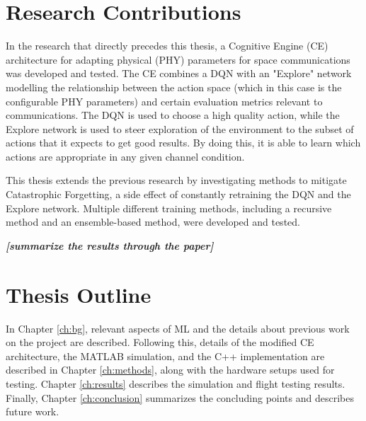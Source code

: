 \section{Research Contributions}
\par In the research that directly precedes this thesis\cite{paulo_theory_paper}\cite{tim_implementation_paper}, a Cognitive Engine (CE) architecture for adapting physical (PHY) parameters for space communications was developed and tested. The CE combines a DQN with an "Explore" network modelling the relationship between the action space (which in this case is the configurable PHY parameters) and certain evaluation metrics relevant to communications. The DQN is used to choose a high quality action, while the Explore network is used to steer exploration of the environment to the subset of actions that it expects to get good results. By doing this, it is able to learn which actions are appropriate in any given channel condition.  
\par This thesis extends the previous research by investigating methods to mitigate Catastrophic Forgetting, a side effect of constantly retraining the DQN and the Explore network. Multiple different training methods, including a recursive method and an ensemble-based method, were developed and tested. 
\par \textit{\textbf{ [summarize the results through the paper]}}
\section{Thesis Outline}
\par In Chapter \ref{ch:bg}, relevant aspects of ML and the details about previous work on the project are described. Following this, details of the modified CE architecture, the MATLAB simulation, and the C++ implementation are described in Chapter \ref{ch:methods}, along with the hardware setups used for testing. Chapter \ref{ch:results} describes the simulation and flight testing results. Finally, Chapter \ref{ch:conclusion} summarizes the concluding points and describes future work.
